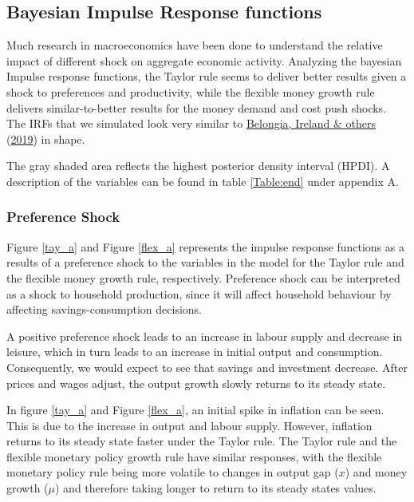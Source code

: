 \documentclass[11pt,preprint, authoryear]{elsarticle}
\numberwithin{equation}{section}
\numberwithin{figure}{section}
\numberwithin{table}{section}
\begin{document}
\hypertarget{bayesian-impulse-response-functions}{%
\subsection{Bayesian Impulse Response
functions}\label{bayesian-impulse-response-functions}}

Much research in macroeconomics have been done to understand the
relative impact of different shock on aggregate economic activity.
Analyzing the bayesian Impulse response functions, the Taylor rule seems
to deliver better results given a shock to preferences and productivity,
while the flexible money growth rule delivers similar-to-better results
for the money demand and cost push shocks. The IRFs that we simulated
look very similar to
\protect\hyperlink{ref-belongia2019reconsideration}{Belongia, Ireland \&
others} (\protect\hyperlink{ref-belongia2019reconsideration}{2019}) in
shape.

The gray shaded area reflects the highest posterior density interval
(HPDI). A description of the variables can be found in table
\ref{Table:end} under appendix A.

\hypertarget{preference-shock}{%
\subsubsection{Preference Shock}\label{preference-shock}}

Figure \ref{tay_a} and Figure \ref{flex_a} represents the impulse
response functions as a results of a preference shock to the variables
in the model for the Taylor rule and the flexible money growth rule,
respectively. Preference shock can be interpreted as a shock to
household production, since it will affect household behaviour by
affecting savings-consumption decisions.

A positive preference shock leads to an increase in labour supply and
decrease in leisure, which in turn leads to an increase in initial
output and consumption. Consequently, we would expect to see that
savings and investment decrease. After prices and wages adjust, the
output growth slowly returns to its steady state.

In figure \ref{tay_a} and Figure \ref{flex_a}, an initial spike in
inflation can be seen. This is due to the increase in output and labour
supply. However, inflation returns to its steady state faster under the
Taylor rule. The Taylor rule and the flexible monetary policy growth
rule have similar responses, with the flexible monetary policy rule
being more volatile to changes in output gap (\(x\)) and money growth
(\(\mu\)) and therefore taking longer to return to its steady states
values.
\end{document}
